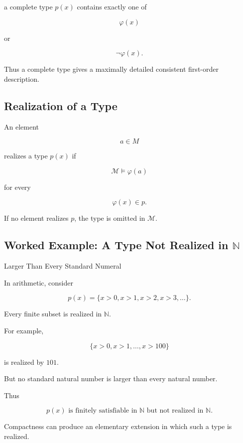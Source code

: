 a complete type \(p(x)\) contains exactly one of

\[
\boxed{
\varphi(x)
}
\]

or

\[
\boxed{
\neg\varphi(x).
}
\]

Thus a complete type gives a maximally detailed consistent first-order
description.

\subsection{Realization of a Type}
\label{subsec:realization-of-types}

An element

\[
a\in M
\]

realizes a type \(p(x)\) if

\[
\boxed{
\mathcal{M}\models\varphi(a)
}
\]

for every

\[
\varphi(x)\in p.
\]

If no element realizes \(p\), the type is omitted in \(\mathcal{M}\).

\subsection{Worked Example: A Type Not Realized in \(\mathbb{N}\)}
\label{subsec:worked-unrealized-type}

\begin{workedexamplebox}{Larger Than Every Standard Numeral}

In arithmetic, consider

\[
p(x)
=
\{
x>0,
x>1,
x>2,
x>3,\ldots
\}.
\]

Every finite subset is realized in \(\mathbb{N}\).

For example,

\[
\{
x>0,
x>1,
\ldots,
x>100
\}
\]

is realized by \(101\).

But no standard natural number is larger than every natural number.

Thus

\begin{answerbox}
\[
\boxed{
p(x)
\text{ is finitely satisfiable in }\mathbb{N}
\text{ but not realized in }\mathbb{N}.
}
\]
\end{answerbox}

Compactness can produce an elementary extension in which such a type is
realized.

\end{workedexamplebox}

